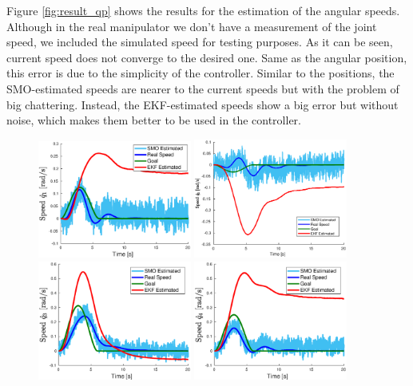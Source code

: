 \documentclass[smallextended]{svjour3}       %
\begin{document}
Figure \ref{fig:result_qp} shows the results for the estimation of the angular speeds. Although in the real manipulator we don't have a measurement of the joint speed, we included the simulated speed for testing purposes. As it can be seen, current speed does not converge to the desired one. Same as the angular position, this error is due to the simplicity of the controller. Similar to the positions, the SMO-estimated speeds are nearer to the current speeds but with the problem of big chattering. Instead, the EKF-estimated speeds show a big error but without noise, which makes them better to be used in the controller. 
\begin{figure}
  \centering
  \includegraphics[width=0.45\textwidth]{Figures/result_qp1.eps}
  \includegraphics[width=0.45\textwidth]{Figures/result_qp2.eps}
  \includegraphics[width=0.45\textwidth]{Figures/result_qp3.eps}
  \includegraphics[width=0.45\textwidth]{Figures/result_qp4.eps}

\end{figure}
\end{document}
